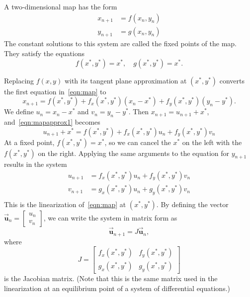 \documentclass{book}
\newcommand{\BU}{\vec{\textbf{u}}}
\begin{document}
A two-dimensional map has the form
\begin{equation}
\begin{split}
  x_{n+1} & = f(x_n,y_n) \\
  y_{n+1} & = g(x_n,y_n)
\end{split}
\label{eqn:map}
\end{equation}
The constant solutions to this system are called the fixed points
of the map.
They satisfy the equations
\begin{equation}
    f(x^*,y^*) = x^*, \quad g(x^*,y^*) = x^*.
\end{equation}

Replacing $f(x,y)$ with its tangent plane
approximation at $(x^*,y^*)$ converts the first equation in~\eqref{eqn:map}
to
\begin{equation}
  x_{n+1} = f(x^*,y^*) + f_x(x^*,y^*)(x_n-x^*) + f_y(x^*,y^*)(y_n-y^*).
\label{eqn:mapapprox1}
\end{equation}
We define $u_n = x_n - x^*$ and
$v_n = y_n - y^*$.  Then $x_{n+1} = u_{n+1} + x^*$, and~\eqref{eqn:mapapprox1}
becomes
\begin{equation}
   u_{n+1} + x^* = f(x^*,y^*) + f_x(x^*,y^*)u_n + f_y(x^*,y^*)v_n
\end{equation}
At a fixed point, $f(x^*,y^*) = x^*$, so we can cancel the $x^*$ on the
left with the $f(x^*,y^*)$ on the right.  Applying the same arguments
to the equation for $y_{n+1}$ results in the system
\begin{equation}
\begin{split}
   u_{n+1} & = f_x(x^*,y^*)u_n + f_y(x^*,y^*)v_n \\
   v_{n+1} & = g_x(x^*,y^*)u_n + g_y(x^*,y^*)v_n \\
\end{split}
\end{equation}
This is the linearization
of~\eqref{eqn:map} at $(x^*,y^*)$.
By defining the vector $\BU_n = \begin{bmatrix} u_n \\ v_n \end{bmatrix}$,
we can write the system in matrix form as
\begin{equation}
  \BU_{n+1} = J\BU_n,
\label{eqn:linearizedmap}
\end{equation}
where
\begin{equation}
   J = \begin{bmatrix}
             f_x(x^*,y^*) & f_y(x^*,y^*) \\
	     g_x(x^*,y^*) & g_y(x^*,y^*)
       \end{bmatrix}
\label{eqn:mapjac}
\end{equation}
is the Jacobian matrix.
(Note that this is the same matrix used in the linearization
at an equilibrium point of a system of differential equations.)
\end{document}
